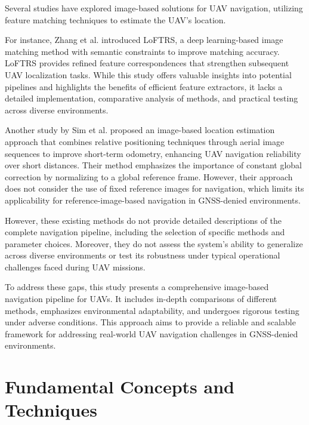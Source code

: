 Several studies have explored image-based solutions for UAV navigation, utilizing feature matching techniques to estimate the UAV's location.

For instance, Zhang et al. \cite{Zhang2024} introduced LoFTRS, a deep learning-based image matching method with semantic constraints to improve matching accuracy. LoFTRS provides refined feature correspondences that strengthen subsequent UAV localization tasks. While this study offers valuable insights into potential pipelines and highlights the benefits of efficient feature extractors, it lacks a detailed implementation, comparative analysis of methods, and practical testing across diverse environments.

Another study by Sim et al. \cite{sim2002integrated} proposed an image-based location estimation approach that combines relative positioning techniques through aerial image sequences to improve short-term odometry, enhancing UAV navigation reliability over short distances. Their method emphasizes the importance of constant global correction by normalizing to a global reference frame. However, their approach does not consider the use of fixed reference images for navigation, which limits its applicability for reference-image-based navigation in GNSS-denied environments.


However, these existing methods do not provide detailed descriptions of the complete navigation pipeline, including the selection of specific methods and parameter choices. Moreover, they do not assess the system's ability to generalize across diverse environments or test its robustness under typical operational challenges faced during UAV missions.

To address these gaps, this study presents a comprehensive image-based navigation pipeline for UAVs. It includes in-depth comparisons of different methods, emphasizes environmental adaptability, and undergoes rigorous testing under adverse conditions. This approach aims to provide a reliable and scalable framework for addressing real-world UAV navigation challenges in GNSS-denied environments.



\section{Fundamental Concepts and Techniques}

